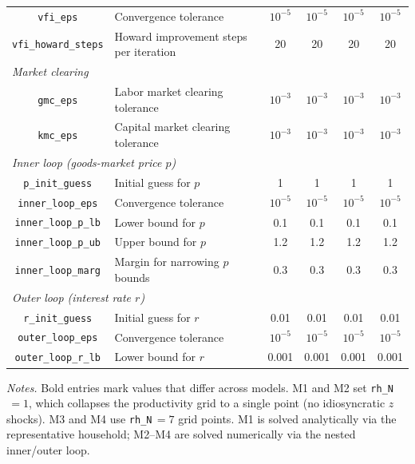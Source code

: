 \documentclass{article}
\begin{document}
\begin{table}[htbp]
\begin{tabular}{clcccc}
\texttt{vfi\_eps}          & Convergence tolerance                           & $10^{-5}$ & $10^{-5}$ & $10^{-5}$ & $10^{-5}$ \\
\texttt{vfi\_howard\_steps}& Howard improvement steps per iteration          & 20    & 20    & 20    & 20    \\
\midrule
\multicolumn{6}{l}{\textit{Market clearing}} \\[2pt]
\texttt{gmc\_eps}  & Labor market clearing tolerance                          & $10^{-3}$ & $10^{-3}$ & $10^{-3}$ & $10^{-3}$ \\
\texttt{kmc\_eps}  & Capital market clearing tolerance                        & $10^{-3}$ & $10^{-3}$ & $10^{-3}$ & $10^{-3}$ \\
\midrule
\multicolumn{6}{l}{\textit{Inner loop (goods-market price $p$)}} \\[2pt]
\texttt{p\_init\_guess}    & Initial guess for $p$                           & 1     & 1     & 1     & 1     \\
\texttt{inner\_loop\_eps}  & Convergence tolerance                           & $10^{-5}$ & $10^{-5}$ & $10^{-5}$ & $10^{-5}$ \\
\texttt{inner\_loop\_p\_lb}& Lower bound for $p$                             & 0.1   & 0.1   & 0.1   & 0.1   \\
\texttt{inner\_loop\_p\_ub}& Upper bound for $p$                             & 1.2   & 1.2   & 1.2   & 1.2   \\
\texttt{inner\_loop\_marg} & Margin for narrowing $p$ bounds                 & 0.3   & 0.3   & 0.3   & 0.3   \\
\midrule
\multicolumn{6}{l}{\textit{Outer loop (interest rate $r$)}} \\[2pt]
\texttt{r\_init\_guess}    & Initial guess for $r$                           & 0.01  & 0.01  & 0.01  & 0.01  \\
\texttt{outer\_loop\_eps}  & Convergence tolerance                           & $10^{-5}$ & $10^{-5}$ & $10^{-5}$ & $10^{-5}$ \\
\texttt{outer\_loop\_r\_lb}& Lower bound for $r$                             & 0.001 & 0.001 & 0.001 & 0.001 \\
\bottomrule
\end{tabular}

\vspace{4pt}
\begin{minipage}{0.92\textwidth}\footnotesize
\textit{Notes.} Bold entries mark values that differ across models. M1 and M2 set \texttt{rh\_N}$\,=1$, which collapses the productivity grid to a single point (no idiosyncratic $z$ shocks). M3 and M4 use \texttt{rh\_N}$\,=7$ grid points. M1 is solved analytically via the representative household; M2--M4 are solved numerically via the nested inner/outer loop.
\end{minipage}
\end{table}
\end{document}
